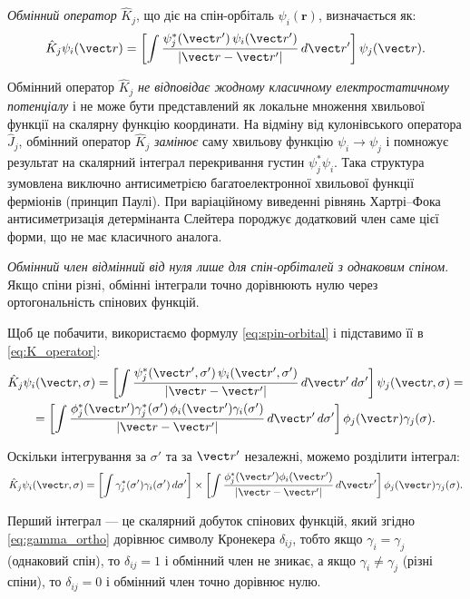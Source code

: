 \emph{Обмінний оператор} $\hat{K}_j$, що діє на спін-орбіталь $\psi_i(\mathbf{r})$, визначається як:
\begin{equation}\label{eq:K_operator}
	\hat K_j \psi_i(\vect r)
	= \left[
		\int \frac{\psi_j^*(\vect r')\,\psi_i(\vect r')}
		{|\vect r - \vect r'|}\, d\vect r'
		\right]\psi_j(\vect r).
\end{equation}


Обмінний оператор $\hat{K}_j$ \emph{не відповідає жодному класичному електростатичному потенціалу} і не може бути представлений як локальне множення хвильової функції на скалярну функцію координати. На відміну від кулонівського оператора $\hat{J}_j$, обмінний оператор $\hat{K}_j$  \emph{замінює} саму хвильову функцію $\psi_i \to \psi_j$ і помножує результат на скалярний інтеграл перекривання густин $\psi_j^* \psi_i$. Така структура зумовлена виключно антисиметрією багатоелектронної хвильової функції ферміонів (принцип Паулі). При варіаційному виведенні рівнянь Хартрі–Фока антисиметризація детермінанта Слейтера породжує додатковий член саме цієї форми, що не має класичного аналога.

\begin{commentbox}
	\emph{Обмінний член відмінний від нуля лише для спін-орбіталей з однаковим спіном}. Якщо спіни різні, обмінні інтеграли точно дорівнюють нулю через ортогональність спінових функцій.

	Щоб це побачити, використаємо формулу \eqref{eq:spin-orbital} і підставимо її в \eqref{eq:K_operator}:
	\begin{multline*}
		\hat K_j \psi_i(\vect r, \sigma)
		= \left[
			\int \frac{\psi_j^*(\vect r', \sigma')\,\psi_i(\vect r', \sigma')}
			{|\vect r - \vect r'|}\, d\vect r'\, d\sigma'
			\right]\psi_j(\vect r, \sigma) = \\
		= \left[
			\int \frac{\phi_j^*(\vect r')\gamma_j^*(\sigma')\,\phi_i(\vect r')\gamma_i(\sigma')}
			{|\vect r - \vect r'|}\, d\vect r'\, d\sigma'
			\right]\phi_j(\vect r)\gamma_j(\sigma).
	\end{multline*}

	Оскільки інтегрування за $\sigma'$ та за $\vect r'$ незалежні, можемо розділити інтеграл:
	\begin{equation*}
		\hat K_j \psi_i(\vect r, \sigma)
		= \left[
			\int \gamma_j^*(\sigma')\gamma_i(\sigma')\, d\sigma'
			\right]  \times \left[
			\int \frac{\phi_j^*(\vect r')\phi_i(\vect r')}
			{|\vect r - \vect r'|}\, d\vect r'
			\right]\phi_j(\vect r)\gamma_j(\sigma).
	\end{equation*}

	Перший інтеграл --- це скалярний добуток спінових функцій, який згідно \eqref{eq:gamma_ortho} дорівнює символу Кронекера $\delta_{ij}$, тобто якщо $\gamma_i = \gamma_j$ (однаковий спін), то $\delta_{ij} = 1$ і обмінний член не зникає, а якщо  $\gamma_i \neq \gamma_j$ (різні спіни), то $\delta_{ij}  = 0$ і обмінний член точно дорівнює нулю.


\end{commentbox}


